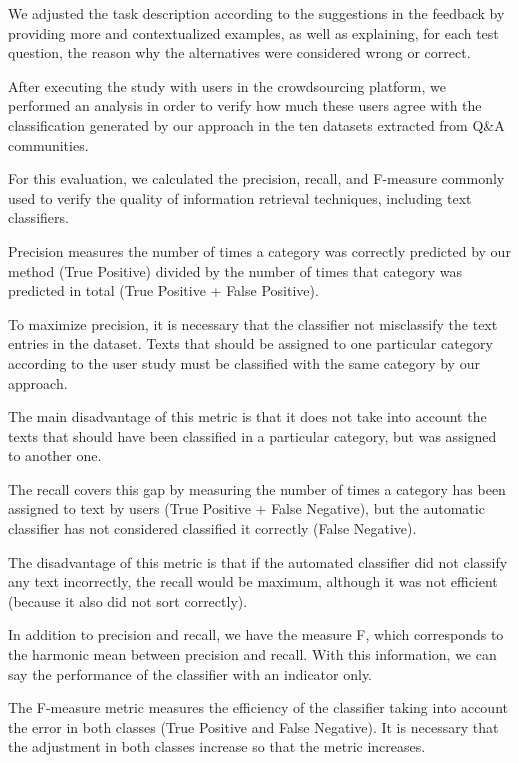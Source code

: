 We adjusted the task description according to the suggestions in the feedback by providing more and contextualized examples, as well as explaining, for each test question, the reason why the alternatives were considered wrong or correct.  

After executing the study with users in the crowdsourcing platform, we performed an analysis in order to verify how much these users agree with the classification generated by our approach in the ten datasets extracted from Q\&A communities.

For this evaluation, we calculated the precision, recall, and F-measure commonly used to verify the quality of information retrieval techniques, including text classifiers\cite{makhoul1999performance}.

Precision measures the number of times a category was correctly predicted by our method (True Positive) divided by the number of times that category was predicted in total (True Positive + False Positive).

To maximize precision, it is necessary that the classifier not misclassify the text entries in the dataset. Texts that should be assigned to one particular category according to the user study must be classified with the same category by our approach.

The main disadvantage of this metric is that it does not take into account the texts that should have been classified in a particular category, but was assigned to another one.

The recall covers this gap by measuring the number of times a category has been assigned to text by users (True Positive + False Negative), but the automatic classifier has not considered classified it correctly (False Negative).

The disadvantage of this metric is that if the automated classifier did not classify any text incorrectly, the recall would be maximum, although it was not efficient (because it also did not sort correctly).

In addition to precision and recall, we have the measure F, which corresponds to the harmonic mean between precision and recall. With this information, we can say the performance of the classifier with an indicator only.

The F-measure metric measures the efficiency of the classifier taking into account the error in both classes (True Positive and False Negative). It is necessary that the adjustment in both classes increase so that the metric increases. 

